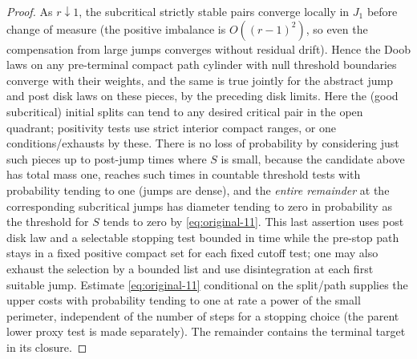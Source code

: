 \begin{proof}



As \(r\downarrow1\), the subcritical strictly stable pairs converge locally in \(J_1\) before change of measure (the positive imbalance is \(O((r-1)^2)\), so even the compensation from large jumps converges without residual drift).
Hence the Doob laws on any pre-terminal compact path cylinder with null threshold boundaries converge with their weights, and the same is true jointly for the abstract jump and post disk laws on these pieces, by the preceding disk limits.
Here the (good subcritical) initial splits can tend to any desired critical pair in the open quadrant; positivity tests use strict interior compact ranges, or one conditions/exhausts by these.
There is no loss of probability by considering just such pieces up to post-jump times where \(S\) is small, because the candidate above has total mass one, reaches such times in countable threshold tests with probability tending to one (jumps are dense), and the \emph{entire remainder} at the corresponding subcritical jumps has diameter tending to zero in probability as the threshold for \(S\) tends to zero by \eqref{eq:original-11}.
This last assertion uses post disk law and a selectable stopping test bounded in time while the pre-stop path stays in a fixed positive compact set for each fixed cutoff test; one may also exhaust the selection by a bounded list and use disintegration at each first suitable jump.
Estimate \eqref{eq:original-11} conditional on the split/path supplies the upper costs with probability tending to one at rate a power of the small perimeter, independent of the number of steps for a stopping choice (the parent lower proxy test is made separately).
The remainder contains the terminal target in its closure.


\end{proof}
